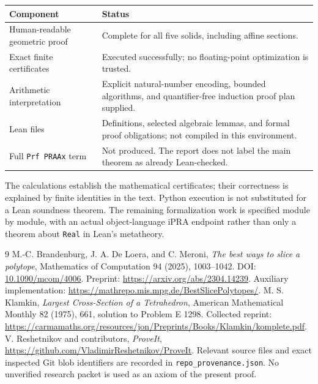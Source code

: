 \documentclass[11pt,letterpaper]{article}
\theoremstyle{definition}\newtheorem{definition}[theorem]{Definition}
\begin{document}
\begin{center}
\begin{tabularx}{\linewidth}{@{}lX@{}}
\toprule
Component & Status\\\midrule
Human-readable geometric proof & Complete for all five solids, including affine sections.\\
Exact finite certificates & Executed successfully; no floating-point optimization is trusted.\\
Arithmetic interpretation & Explicit natural-number encoding, bounded algorithms, and
quantifier-free induction proof plan supplied.\\
Lean files & Definitions, selected algebraic lemmas, and formal proof obligations;
not compiled in this environment.\\
Full \texttt{Prf PRAAx} term & Not produced. The report does not label the main theorem
as already Lean-checked.\\
\bottomrule
\end{tabularx}
\end{center}

The calculations establish the mathematical certificates; their
correctness is explained by finite identities in the text. Python
execution is not substituted for a Lean soundness theorem. The
remaining formalization work is specified module by module, with an
actual object-language iPRA endpoint rather than only a theorem about
\texttt{Real} in Lean's metatheory.

\begin{thebibliography}{9}
 M.-C. Brandenburg, J. A. De Loera, and C. Meroni,
\emph{The best ways to slice a polytope}, Mathematics of Computation
94 (2025), 1003--1042. DOI: \href{https://doi.org/10.1090/mcom/4006}{10.1090/mcom/4006}.
Preprint: \url{https://arxiv.org/abs/2304.14239}. Auxiliary implementation:
\url{https://mathrepo.mis.mpg.de/BestSlicePolytopes/}.
 M. S. Klamkin, \emph{Largest Cross-Section of a Tetrahedron},
American Mathematical Monthly 82 (1975), 661, solution to Problem E 1298.
Collected reprint: \url{https://carmamaths.org/resources/jon/Preprints/Books/Klamkin/komplete.pdf}.
 V. Reshetnikov and contributors, \emph{ProveIt},
\url{https://github.com/VladimirReshetnikov/ProveIt}.
Relevant source files and exact inspected Git blob identifiers are recorded
in \texttt{repo\_provenance.json}. No unverified research packet is used as
an axiom of the present proof.
\end{thebibliography}

\appendix
\clearpage
\begingroup\small


\endgroup
\end{document}
